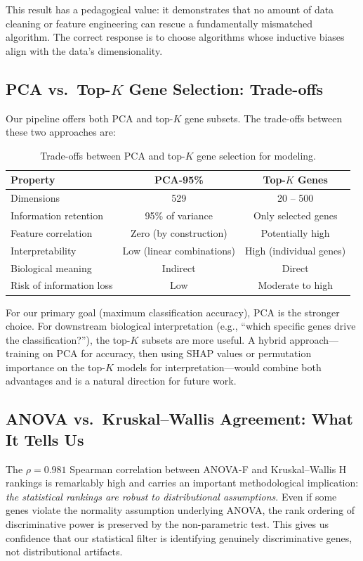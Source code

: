 \documentclass{article}
\begin{document}
This result has a pedagogical value: it demonstrates that no amount of data cleaning or feature engineering can rescue a fundamentally mismatched algorithm. The correct response is to choose algorithms whose inductive biases align with the data's dimensionality.

\subsection{PCA vs.\ Top-$K$ Gene Selection: Trade-offs}
Our pipeline offers both PCA and top-$K$ gene subsets. The trade-offs between these two approaches are:

\begin{table}[H]
\caption{Trade-offs between PCA and top-$K$ gene selection for modeling.}
\begin{center}
\begin{tabular}{lcc}
\toprule
\textbf{Property} & \textbf{PCA-95\%} & \textbf{Top-$K$ Genes}\\
\midrule
Dimensions & 529 & 20 -- 500\\
Information retention & 95\% of variance & Only selected genes\\
Feature correlation & Zero (by construction) & Potentially high\\
Interpretability & Low (linear combinations) & High (individual genes)\\
Biological meaning & Indirect & Direct\\
Risk of information loss & Low & Moderate to high\\
\bottomrule
\end{tabular}
\end{center}
\end{table}

For our primary goal (maximum classification accuracy), PCA is the stronger choice. For downstream biological interpretation (e.g., ``which specific genes drive the classification?''), the top-$K$ subsets are more useful. A hybrid approach---training on PCA for accuracy, then using SHAP values or permutation importance on the top-$K$ models for interpretation---would combine both advantages and is a natural direction for future work.

\subsection{ANOVA vs.\ Kruskal--Wallis Agreement: What It Tells Us}
The $\rho = 0.981$ Spearman correlation between ANOVA-F and Kruskal--Wallis H rankings is remarkably high and carries an important methodological implication: \textit{the statistical rankings are robust to distributional assumptions}. Even if some genes violate the normality assumption underlying ANOVA, the rank ordering of discriminative power is preserved by the non-parametric test. This gives us confidence that our statistical filter is identifying genuinely discriminative genes, not distributional artifacts.
\end{document}

